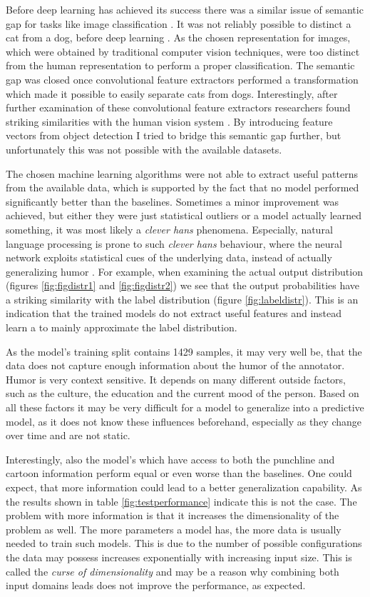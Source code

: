 \documentclass[draft,final,oneside]{vutinfth} %
\begin{document}
Before deep learning has achieved its success there was a similar issue of semantic gap for tasks like image classification \cite{dlvc}. It was not reliably possible to distinct a cat from a dog, before deep learning \cite{alexnet}. As the chosen representation for images, which were obtained by traditional computer vision techniques, were too distinct from the human representation to perform a proper classification. The semantic gap was closed once convolutional feature extractors performed a transformation which made it possible to easily separate cats from dogs. Interestingly, after further examination of these convolutional feature extractors researchers found striking similarities with the human vision system  \cite{Cichy2016}. By introducing feature vectors from object detection I tried to bridge this semantic gap further, but unfortunately this was not possible with the available datasets.

The chosen machine learning algorithms were not able to extract useful patterns from the available data, which is supported by the fact that no model performed significantly better than the baselines. Sometimes a minor improvement was achieved, but either they were just statistical outliers or a model actually learned something, it was most likely a \textit{clever hans} phenomena. Especially, natural language processing is prone to such \textit{clever hans} behaviour, where the neural network exploits statistical cues of the underlying data, instead of actually generalizing humor \cite{cleverhans}. For example, when examining the actual output distribution (figures \ref{fig:figdistr1} and \ref{fig:figdistr2}) we see that the output probabilities have a striking similarity with the label distribution (figure \ref{fig:labeldistr}). This is an indication that the trained models do not extract useful features and instead learn a to mainly approximate the label distribution.

As the model's training split contains 1429 samples, it may very well be, that the data does not capture enough information about the humor of the annotator. Humor is very context sensitive. It depends on many different outside factors, such as the culture, the education and the current mood of the person. Based on all these factors it may be very difficult for a model to generalize into a predictive model, as it does not know these influences beforehand, especially as they change over time and are not static.

Interestingly, also the model's which have access to both the punchline and cartoon information perform equal or even worse than the baselines. One could expect, that more information could lead to a better generalization capability. As the results shown in table \ref{fig:testperformance} indicate this is not the case. The problem with more information is that it increases the dimensionality of the problem as well. The more parameters a model has, the more data is usually needed to train such models. This is due to the number of possible configurations the data may possess increases exponentially with increasing input size. This is called the \textit{curse of dimensionality} \cite{Goodfellow-et-al-2016} and may be a reason why combining both input domains leads does not improve the performance, as expected.
\end{document}
